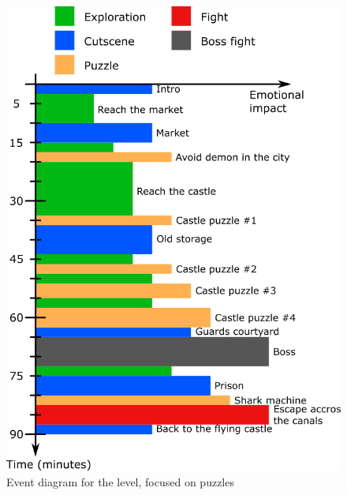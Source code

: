 \begin{figure}[H]
  \centering
  \includegraphics[width=12cm]{../Images/Diagrams/eventDiagramPuzzles}
  \caption{Event diagram for the level, focused on puzzles}
\end{figure}
